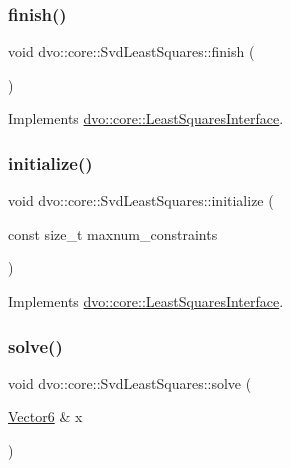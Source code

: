 \subsubsection{\texorpdfstring{finish()}{finish()}}
{\footnotesize\ttfamily void dvo\+::core\+::\+Svd\+Least\+Squares\+::finish (\begin{DoxyParamCaption}{ }\end{DoxyParamCaption})\hspace{0.3cm}{\ttfamily [virtual]}}



Implements \mbox{\hyperlink{classdvo_1_1core_1_1_least_squares_interface_a2e580a70e96f0e7d6d70f6047891a42a}{dvo\+::core\+::\+Least\+Squares\+Interface}}.

\mbox{\label{classdvo_1_1core_1_1_svd_least_squares_aa09756d97cb63e8dc8276a88a1a07791}} 
\subsubsection{\texorpdfstring{initialize()}{initialize()}}
{\footnotesize\ttfamily void dvo\+::core\+::\+Svd\+Least\+Squares\+::initialize (\begin{DoxyParamCaption}\item[{const size\+\_\+t}]{maxnum\+\_\+constraints }\end{DoxyParamCaption})\hspace{0.3cm}{\ttfamily [virtual]}}



Implements \mbox{\hyperlink{classdvo_1_1core_1_1_least_squares_interface_a09e5784f74d7352a9550a8aa523d30d7}{dvo\+::core\+::\+Least\+Squares\+Interface}}.

\mbox{\label{classdvo_1_1core_1_1_svd_least_squares_ae0124d7c24b90b1101bf38da59f789aa}} 
\subsubsection{\texorpdfstring{solve()}{solve()}}
{\footnotesize\ttfamily void dvo\+::core\+::\+Svd\+Least\+Squares\+::solve (\begin{DoxyParamCaption}\item[{\mbox{\hyperlink{namespacedvo_1_1core_a05327f3312d32a301bce9fccda9e5807}{Vector6}} \&}]{x }\end{DoxyParamCaption})\hspace{0.3cm}{\ttfamily [virtual]}}



